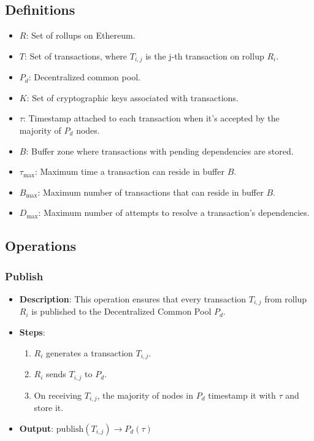 \documentclass{article}
\begin{document}
\subsection{Definitions}

\begin{itemize}
    \item \( R \): Set of rollups on Ethereum.
    \item \( T \): Set of transactions, where \( T_{i,j} \) is the j-th transaction on rollup \( R_i \).
    \item \( P_d \): Decentralized common pool.
    \item \( K \): Set of cryptographic keys associated with transactions.
    \item \( \tau \): Timestamp attached to each transaction when it's accepted by the majority of \( P_d \) nodes.
    \item \( B \): Buffer zone where transactions with pending dependencies are stored.
    \item \( \tau_{\text{max}} \): Maximum time a transaction can reside in buffer \( B \).
    \item \( B_{\text{max}} \): Maximum number of transactions that can reside in buffer \( B \).
    \item \( D_{\text{max}} \): Maximum number of attempts to resolve a transaction's dependencies.
\end{itemize}

\subsection{Operations}

\subsubsection{Publish}
\begin{itemize}
    \item \textbf{Description}: This operation ensures that every transaction \( T_{i,j} \) from rollup \( R_i \) is published to the Decentralized Common Pool \( P_d \).
    \item \textbf{Steps}:
    \begin{enumerate}
        \item \( R_i \) generates a transaction \( T_{i,j} \).
        \item \( R_i \) sends \( T_{i,j} \) to \( P_d \).
        \item On receiving \( T_{i,j} \), the majority of nodes in \( P_d \) timestamp it with \( \tau \) and store it.
    \end{enumerate}
    \item \textbf{Output}: \( \text{publish}(T_{i,j}) \rightarrow P_d(\tau) \)
\end{itemize}
\end{document}
